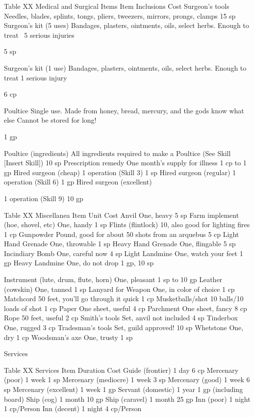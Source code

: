 \documentclass[oneside,11pt,english]{book}
\begin{document}
 
Table XX Medical and Surgical Items 
Item Inclusions Cost 
Surgeon’s tools Needles, blades, splints, tongs, pliers, tweezers, mirrors, prongs, clamps 15 sp 
Surgeon’s kit (5 uses) Bandages, plasters, ointments, oils, select herbs. Enough to treat ~5 serious 
injuries 

5 sp 

Surgeon’s kit (1 use) Bandages, plasters, ointments, oils, select herbs. Enough to treat 1 serious 
injury 

6 cp 

Poultice Single use. Made from honey, bread, mercury, and the gods know what else 
Cannot be stored for long! 

1 gp 

Poultice (ingredients) All ingredients required to make a Poultice (See Skill [Insert Skill]) 10 sp 
Prescription remedy One month’s supply for illness 1 cp to 1 
gp 
Hired surgeon (cheap) 1 operation (Skill 3) 1 sp 
Hired surgeon (regular) 1 operation (Skill 6) 1 gp 
Hired surgeon 
(excellent) 

1 operation (Skill 9) 10 gp 

 
Table XX Miscellanea 
Item Unit Cost 
Anvil One, heavy 5 sp 
Farm implement (hoe, shovel, etc) One, handy 1 sp 
Flints (flintlock) 10, also good for lighting fires 1 cp 
Gunpowder Pound, good for about 50 shots from an arquebus 5 cp 
Light Hand Grenade One, throwable 1 sp 
Heavy Hand Grenade One, flingable 5 sp 
Incindiary Bomb One, careful now 4 sp 
Light Landmine One, watch your feet 1 gp 
Heavy Landmine One, do not drop 1 gp, 10 sp 


Instrument (lute, drum, flute, horn) One, pleasant 1 sp to 10 gp 
Leather (cowskin) One, tanned 1 sp 
Lanyard for Weapon One, in color of choice 1 cp 
Matchcord 50 feet, you’ll go through it quick 1 cp 
Musketballs/shot 10 balls/10 loads of shot 1 cp 
Paper One sheet, useful 4 cp 
Parchment One sheet, fancy 8 cp 
Rope 50 feet, useful 2 cp 
Smith’s tools Set, anvil not included 4 sp 
Tinderbox One, rugged 3 cp 
Tradesman’s tools Set, guild approved! 10 sp 
Whetstone One, dry 1 cp 
Woodsman’s axe One, trusty 1 sp 

 

Services 

 
Table XX Services 
Item Duration Cost 
Guide (frontier) 1 day 6 cp 
Mercenary (poor) 1 week 1 sp 
Mercenary (mediocre) 1 week 3 sp 
Mercenary (good) 1 week 6 sp 
Mercenary (excellent) 1 week 1 gp 
Servant (domestic) 1 year 1 gp (including board) 
Ship (cog) 1 month 10 gp 
Ship (caravel) 1 month 25 gp 
Inn (poor) 1 night 1 cp/Person 
Inn (decent) 1 night 4 cp/Person 
\end{document}
